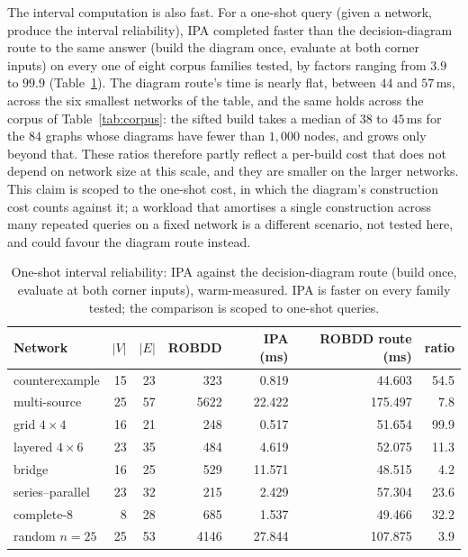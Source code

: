 \documentclass[preprint,12pt]{elsarticle}
\begin{document}
The interval computation is also fast. For a one-shot query (given a network, produce the interval reliability), IPA completed faster than the decision-diagram route to the same answer (build the diagram once, evaluate at both corner inputs) on every one of eight corpus families tested, by factors ranging from $3.9$ to $99.9$ (Table~\ref{tab:interval_timing}). The diagram route's time is nearly flat, between $44$ and $57$\,ms, across the six smallest networks of the table, and the same holds across the corpus of Table~\ref{tab:corpus}: the sifted build takes a median of $38$ to $45$\,ms for the $84$ graphs whose diagrams have fewer than $1{,}000$ nodes, and grows only beyond that. These ratios therefore partly reflect a per-build cost that does not depend on network size at this scale, and they are smaller on the larger networks. This claim is scoped to the one-shot cost, in which the diagram's construction cost counts against it; a workload that amortises a single construction across many repeated queries on a fixed network is a different scenario, not tested here, and could favour the diagram route instead.

\begin{table}[ht]
\centering\small
\caption{One-shot interval reliability: IPA against the decision-diagram route (build once, evaluate at both corner inputs), warm-measured. IPA is faster on every family tested; the comparison is scoped to one-shot queries.}
\label{tab:interval_timing}
\begin{tabular}{lrrrrrr}
\toprule
Network & $|V|$ & $|E|$ & ROBDD & IPA (ms) & ROBDD route (ms) & ratio \\
\midrule
counterexample       & 15 & 23 &  323 &  0.819 &  44.603 & 54.5 \\
multi-source         & 25 & 57 & 5622 & 22.422 & 175.497 &  7.8 \\
grid $4\times4$      & 16 & 21 &  248 &  0.517 &  51.654 & 99.9 \\
layered $4\times6$   & 23 & 35 &  484 &  4.619 &  52.075 & 11.3 \\
bridge               & 16 & 25 &  529 & 11.571 &  48.515 &  4.2 \\
series--parallel     & 23 & 32 &  215 &  2.429 &  57.304 & 23.6 \\
complete-8           &  8 & 28 &  685 &  1.537 &  49.466 & 32.2 \\
random $n{=}25$      & 25 & 53 & 4146 & 27.844 & 107.875 &  3.9 \\
\bottomrule
\end{tabular}
\end{table}
\end{document}
